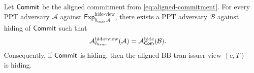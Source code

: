 \begin{theorem}\label{thm:tran-commit-hiding}
Let \(\mathsf{Commit}\) be the aligned commitment from \eqref{eq:aligned-commitment}. For every PPT adversary
\(\mathcal A\) against \(\mathsf{Exp}^{\mathrm{hide\mbox{-}view}}_{h_{\mathrm{tran}},\mathcal A}\), there exists a PPT
adversary \(\mathcal B\) against hiding of \(\mathsf{Commit}\) such that
\begin{equation}\label{eq:tran-commit-hiding-red}
\mathcal{A}^{\mathrm{hide\mbox{-}view}}_{h_{\mathrm{tran}}}(\mathcal A)
=
\mathcal{A}^{\mathrm{hide}}_{\mathsf{Com}}(\mathcal B).
\end{equation}
Consequently, if \(\mathsf{Commit}\) is hiding, then the aligned BB-tran issuer view \((c,T)\) is hiding.
\end{theorem}

